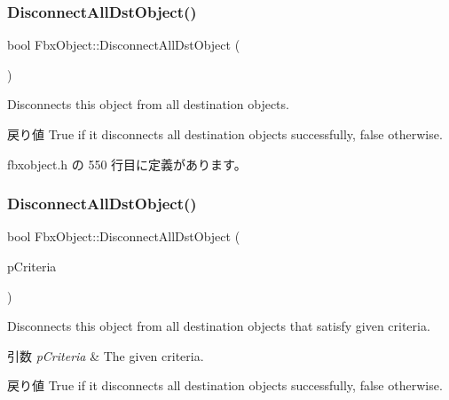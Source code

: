 \mbox{\label{class_fbx_object_a5ebe517e8b3f221285b9754009c0660b}} 
\subsubsection{\texorpdfstring{Disconnect\+All\+Dst\+Object()}{DisconnectAllDstObject()}\hspace{0.1cm}{\footnotesize\ttfamily [1/4]}}
{\footnotesize\ttfamily bool Fbx\+Object\+::\+Disconnect\+All\+Dst\+Object (\begin{DoxyParamCaption}{ }\end{DoxyParamCaption})\hspace{0.3cm}{\ttfamily [inline]}}

Disconnects this object from all destination objects. \begin{DoxyReturn}{戻り値}
{\ttfamily True} if it disconnects all destination objects successfully, {\ttfamily false} otherwise. 
\end{DoxyReturn}


 fbxobject.\+h の 550 行目に定義があります。

\mbox{\label{class_fbx_object_a5668d54f53f16f5ffad95727f92a8ee6}} 
\subsubsection{\texorpdfstring{Disconnect\+All\+Dst\+Object()}{DisconnectAllDstObject()}\hspace{0.1cm}{\footnotesize\ttfamily [2/4]}}
{\footnotesize\ttfamily bool Fbx\+Object\+::\+Disconnect\+All\+Dst\+Object (\begin{DoxyParamCaption}\item[{const \hyperlink{class_fbx_criteria}{Fbx\+Criteria} \&}]{p\+Criteria }\end{DoxyParamCaption})\hspace{0.3cm}{\ttfamily [inline]}}

Disconnects this object from all destination objects that satisfy given criteria. 
\begin{DoxyParams}{引数}
{\em p\+Criteria} & The given criteria. \\
\hline
\end{DoxyParams}
\begin{DoxyReturn}{戻り値}
{\ttfamily True} if it disconnects all destination objects successfully, {\ttfamily false} otherwise. 
\end{DoxyReturn}


